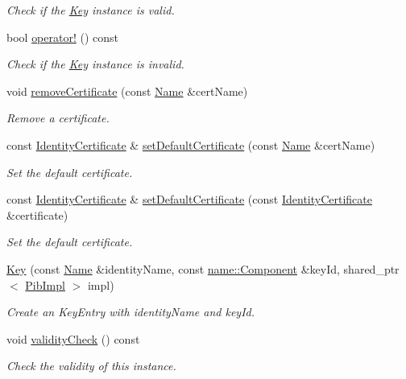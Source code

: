 \begin{DoxyCompactItemize}
\begin{DoxyCompactList}\small\item\em Check if the \hyperlink{classndn_1_1security_1_1Key}{Key} instance is valid. \end{DoxyCompactList}\item 
bool \hyperlink{classndn_1_1security_1_1Key_aaf9dab68be2d09e86794449d381d2178}{operator!} () const\hypertarget{classndn_1_1security_1_1Key_aaf9dab68be2d09e86794449d381d2178}{}\label{classndn_1_1security_1_1Key_aaf9dab68be2d09e86794449d381d2178}

\begin{DoxyCompactList}\small\item\em Check if the \hyperlink{classndn_1_1security_1_1Key}{Key} instance is invalid. \end{DoxyCompactList}\item 
void \hyperlink{classndn_1_1security_1_1Key_aa7fe309c5dca6f1a99c9da3fb183d455}{remove\+Certificate} (const \hyperlink{classndn_1_1Name}{Name} \&cert\+Name)
\begin{DoxyCompactList}\small\item\em Remove a certificate. \end{DoxyCompactList}\item 
const \hyperlink{classndn_1_1IdentityCertificate}{Identity\+Certificate} \& \hyperlink{classndn_1_1security_1_1Key_a0a3bedae717541c4bfc677cc41116207}{set\+Default\+Certificate} (const \hyperlink{classndn_1_1Name}{Name} \&cert\+Name)
\begin{DoxyCompactList}\small\item\em Set the default certificate. \end{DoxyCompactList}\item 
const \hyperlink{classndn_1_1IdentityCertificate}{Identity\+Certificate} \& \hyperlink{classndn_1_1security_1_1Key_a8ce36a3e607c1ddf19872ad1651f404c}{set\+Default\+Certificate} (const \hyperlink{classndn_1_1IdentityCertificate}{Identity\+Certificate} \&certificate)
\begin{DoxyCompactList}\small\item\em Set the default certificate. \end{DoxyCompactList}\item 
\hyperlink{classndn_1_1security_1_1Key_ad11f26d64846944ab7f42e9b96399d10}{Key} (const \hyperlink{classndn_1_1Name}{Name} \&identity\+Name, const \hyperlink{classndn_1_1name_1_1Component}{name\+::\+Component} \&key\+Id, shared\+\_\+ptr$<$ \hyperlink{classndn_1_1security_1_1PibImpl}{Pib\+Impl} $>$ impl)
\begin{DoxyCompactList}\small\item\em Create an Key\+Entry with {\ttfamily identity\+Name} and {\ttfamily key\+Id}. \end{DoxyCompactList}\item 
void \hyperlink{classndn_1_1security_1_1Key_ad70bf0ea07312b373be7db8e1e209762}{validity\+Check} () const
\begin{DoxyCompactList}\small\item\em Check the validity of this instance. \end{DoxyCompactList}\end{DoxyCompactItemize}
